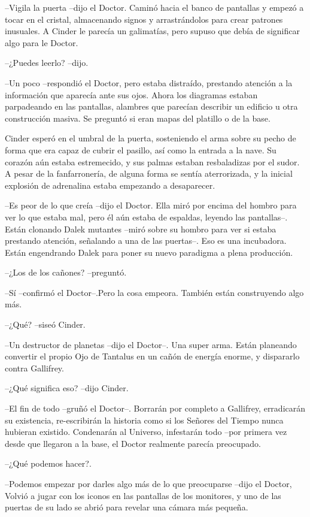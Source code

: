 --Vigila la puerta --dijo el Doctor. Caminó hacia el banco de pantallas y empezó a tocar en el cristal, almacenando signos y arrastrándolos para crear patrones inusuales. A Cinder le parecía un galimatías, pero supuso que debía de significar algo para le Doctor.

--¿Puedes leerlo? --dijo. 

--Un poco --respondió el Doctor, pero estaba distraído, prestando atención a la información que aparecía ante sus ojos. Ahora los diagramas estaban parpadeando en las pantallas, alambres que parecían describir un edificio u otra construcción masiva. Se preguntó si eran mapas del platillo o de la base.

Cinder esperó en el umbral de la puerta, sosteniendo el arma sobre su pecho de forma que era capaz de cubrir el pasillo, así como la entrada a la nave. Su corazón aún estaba estremecido, y sus palmas estaban resbaladizas por el sudor. A pesar de la fanfarronería, de alguna forma se sentía aterrorizada, y la inicial explosión de adrenalina estaba empezando a desaparecer.

--Es peor de lo que creía --dijo el Doctor. Ella miró por encima del hombro para ver lo que estaba mal, pero él aún estaba de espaldas, leyendo las pantallas--. Están clonando Dalek mutantes --miró sobre su hombro para ver si estaba prestando atención, señalando a una de las puertas--. Eso es una incubadora. Están engendrando Dalek para poner su nuevo paradigma a plena producción.

--¿Los de los cañones? --preguntó. 

--Sí --confirmó el Doctor--.Pero la cosa empeora. También están construyendo algo más.

--¿Qué? --siseó Cinder. 

--Un destructor de planetas --dijo el Doctor--. Una super arma. Están planeando convertir el propio Ojo de Tantalus en un cañón de energía enorme, y dispararlo contra Gallifrey.

--¿Qué significa eso? --dijo Cinder. 

--El fin de todo --gruñó el Doctor--. Borrarán por completo a Gallifrey, erradicarán su existencia, re-escribirán la historia como si los Señores del Tiempo nunca hubieran existido. Condenarán al Universo, infestarán todo --por primera vez desde que llegaron a la base, el Doctor realmente parecía preocupado. 

--¿Qué podemos hacer?.

--Podemos empezar por darles algo más de lo que preocuparse --dijo el Doctor, Volvió a jugar con los iconos en las pantallas de los monitores, y uno de las puertas de su lado se abrió para revelar una cámara más pequeña.


